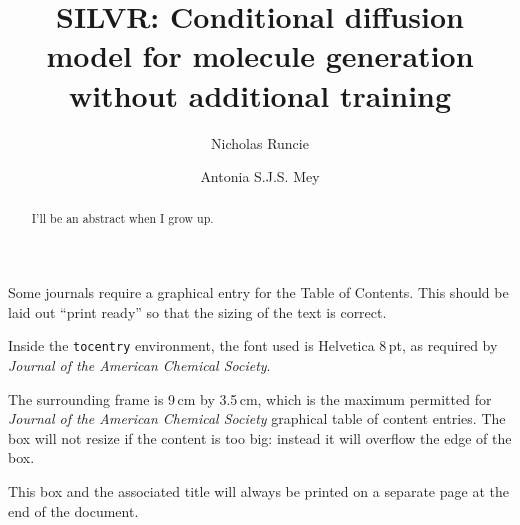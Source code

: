 \documentclass[journal=jacsat,manuscript=article]{achemso}
\author{Nicholas Runcie}
\author{Antonia S.J.S. Mey}
\title[SILVR: Molecular Generation for binding modes]
  {SILVR: Conditional diffusion model for molecule generation without additional training}
\begin{document}
\begin{tocentry}

Some journals require a graphical entry for the Table of Contents.
This should be laid out ``print ready'' so that the sizing of the
text is correct.

Inside the \texttt{tocentry} environment, the font used is Helvetica
8\,pt, as required by \emph{Journal of the American Chemical
Society}.

The surrounding frame is 9\,cm by 3.5\,cm, which is the maximum
permitted for  \emph{Journal of the American Chemical Society}
graphical table of content entries. The box will not resize if the
content is too big: instead it will overflow the edge of the box.

This box and the associated title will always be printed on a
separate page at the end of the document.

\end{tocentry}

\begin{abstract}
I'll be an abstract when I grow up. 
\end{abstract}

\end{document}
